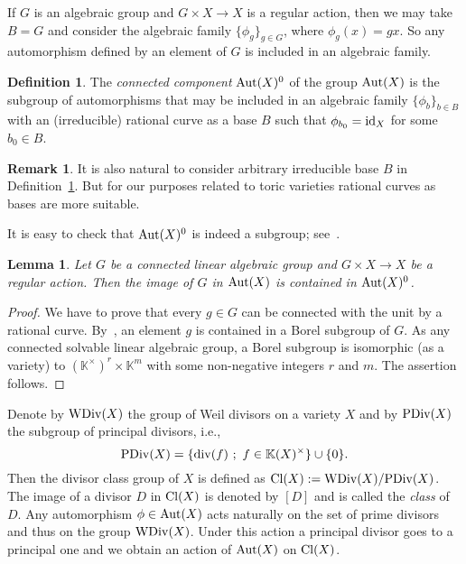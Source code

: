 \documentclass[12pt,a4paper]{amsart}
\theoremstyle{plain}
\newtheorem{lemma}{Lemma}
\theoremstyle{definition}
\newtheorem{definition}{Definition}
\newtheorem{remark}{Remark}
\begin{document}
If $G$ is an algebraic group and $G\times X \to X$ is a regular action, then
we may take $B=G$ and consider the algebraic family $\{\phi_g\}_{g\in G}$, where
$\phi_g(x)=gx$. So any automorphism defined by an element of $G$ is included in
an algebraic family.

\begin{definition} \label{def2}
The {\it connected component} ${\mathop{\rm Aut}}(X)^0$ of the group ${\mathop{\rm Aut}}(X)$ is the subgroup of
automorphisms that may be included in an algebraic family $\{\phi_b\}_{b\in B}$
with an (irreducible) rational curve as a base $B$ such that $\phi_{b_0}={\mathop{\rm id}}_X$ for some
$b_0\in B$.
\end{definition}

\begin{remark}
It is also natural to consider arbitrary irreducible base $B$ in Definition~\ref{def2}.
But for our purposes related to toric varieties rational curves as bases are more suitable.
\end{remark}

It is easy to check that ${\mathop{\rm Aut}}(X)^0$ is indeed a subgroup; see~\cite{Ra}.

\begin{lemma}
Let $G$ be a connected linear algebraic group and $G\times X \to X$ be a regular action.
Then the image of $G$ in ${\mathop{\rm Aut}}(X)$ is contained in ${\mathop{\rm Aut}}(X)^0$.
\end{lemma}

\begin{proof}
We have to prove that every $g\in G$ can be connected with
the unit by a rational curve. By~\cite[Theorem~22.2]{Hu},
an element $g$ is contained in a Borel subgroup of $G$.
As any connected solvable linear algebraic group, a Borel subgroup is isomorphic (as a variety) to
$({{\mathbb K}}^{\times})^r\times{{\mathbb K}}^m$ with some non-negative integers $r$ and $m$.
The assertion follows.
\end{proof}

Denote by ${\mathop{\rm WDiv}}(X)$ the group of Weil divisors on a variety $X$ and by
${\mathop{\rm PDiv}}(X)$ the subgroup of principal divisors, i.e.,
$$
{\mathop{\rm PDiv}}(X)=\{{\mathop{\rm div}}(f) \ ; \ f \in {{\mathbb K}}(X)^{\times}\} \cup \{0\}.
$$
Then the divisor class group of $X$ is defined as ${\mathop{\rm Cl}}(X):={\mathop{\rm WDiv}}(X)/{\mathop{\rm PDiv}}(X)$.
The image of a divisor $D$ in ${\mathop{\rm Cl}}(X)$ is denoted by $[D]$ and is called the {\it class}
of $D$. Any automorphism $\phi\in{\mathop{\rm Aut}}(X)$ acts naturally on the set of prime divisors
and thus on the group ${\mathop{\rm WDiv}}(X)$. Under this action a principal divisor goes
to a principal one and we obtain an action of ${\mathop{\rm Aut}}(X)$ on ${\mathop{\rm Cl}}(X)$.
\end{document}
